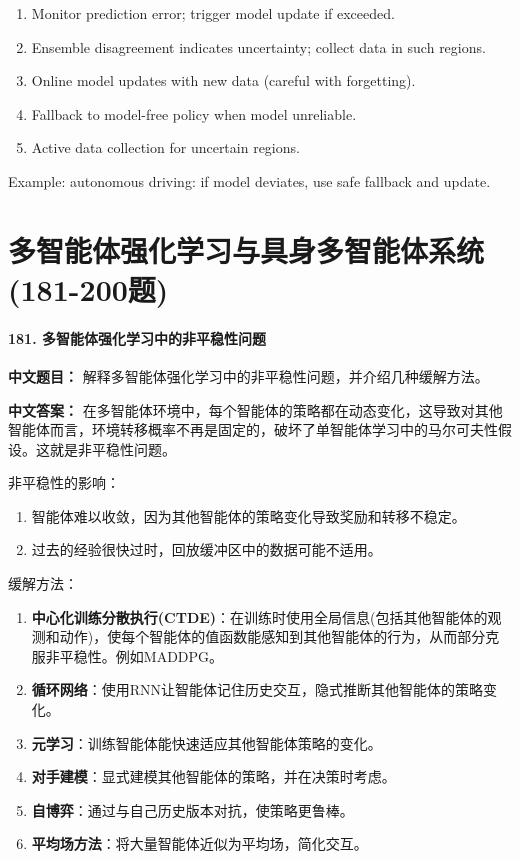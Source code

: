 \documentclass[10pt,a4paper]{ctexart}
\begin{document}
\begin{enumerate}
    \item Monitor prediction error; trigger model update if exceeded.
    \item Ensemble disagreement indicates uncertainty; collect data in such regions.
    \item Online model updates with new data (careful with forgetting).
    \item Fallback to model-free policy when model unreliable.
    \item Active data collection for uncertain regions.
\end{enumerate}

Example: autonomous driving: if model deviates, use safe fallback and update.

\part{多智能体强化学习与具身多智能体系统(181-200题)}

\subsection*{181. 多智能体强化学习中的非平稳性问题}
\textbf{中文题目：} 解释多智能体强化学习中的非平稳性问题，并介绍几种缓解方法。

\textbf{中文答案：}  
在多智能体环境中，每个智能体的策略都在动态变化，这导致对其他智能体而言，环境转移概率不再是固定的，破坏了单智能体学习中的马尔可夫性假设。这就是非平稳性问题。

非平稳性的影响：
\begin{enumerate}
    \item 智能体难以收敛，因为其他智能体的策略变化导致奖励和转移不稳定。
    \item 过去的经验很快过时，回放缓冲区中的数据可能不适用。
\end{enumerate}

缓解方法：
\begin{enumerate}
    \item \textbf{中心化训练分散执行(CTDE)}：在训练时使用全局信息(包括其他智能体的观测和动作)，使每个智能体的值函数能感知到其他智能体的行为，从而部分克服非平稳性。例如MADDPG。
    \item \textbf{循环网络}：使用RNN让智能体记住历史交互，隐式推断其他智能体的策略变化。
    \item \textbf{元学习}：训练智能体能快速适应其他智能体策略的变化。
    \item \textbf{对手建模}：显式建模其他智能体的策略，并在决策时考虑。
    \item \textbf{自博弈}：通过与自己历史版本对抗，使策略更鲁棒。
    \item \textbf{平均场方法}：将大量智能体近似为平均场，简化交互。
\end{enumerate}
\end{document}
